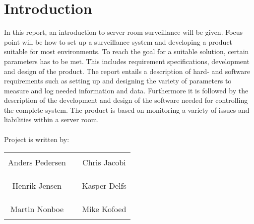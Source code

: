 \chapter*{Introduction}

In this report, an introduction to server room surveillance will be given. Focus point will be how to set up a surveillance system and developing a product suitable for most environments. To reach the goal for a suitable solution, certain parameters has to be met. This includes requirement specifications, development and design of the product. The report entails a description of hard- and software requirements such as setting up and designing the variety of parameters to measure and log needed information and data. Furthermore it is followed by the description of the development and design of the software needed for controlling the complete system. The product is based on monitoring a variety of issues and liabilities within a server room. \\\\


Project is written by:\\
%
\phantom{Luft}\vspace{3cm}
\begin{table}[H]
	\centering
		\begin{tabular}{c c c}
			\underline{\phantom{JAERJAERJAERJAERGO}} & \phantom{cookies} & \underline{\phantom{JAERJAERJAERJAERGO}} \\
			Anders Pedersen			& \phantom{cookies} & Chris Jacobi		\\
			&&\\
			&&\\
			\underline{\phantom{JAERJAERJAERJAERGO}} & \phantom{cookies} & \underline{\phantom{JAERJAERJAERJAERGO}} \\
			Henrik Jensen			& \phantom{cookies} & Kasper Delfs		\\
			&&\\
			&&\\
	    \underline{\phantom{JAERJAERJAERJAERGO}} & \phantom{cookies} & \underline{\phantom{JAERJAERJAERJAERGO}} \\
			Martin Nonboe 					& \phantom{cookies} & Mike Kofoed 			\\			
			&&\\							
		\end{tabular}
\end{table}